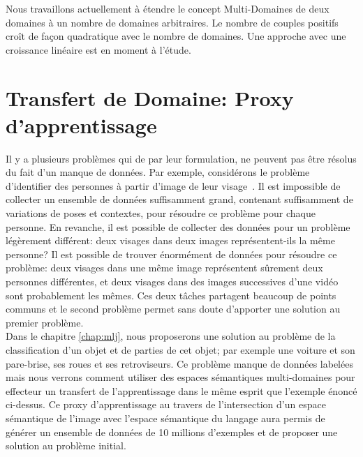 Nous travaillons actuellement à étendre le concept Multi-Domaines de deux
domaines à un nombre de domaines arbitraires. Le nombre de couples positifs
croît de façon quadratique avec le nombre de domaines. Une approche avec
une croissance linéaire est en moment à l'étude.

\section{Transfert de Domaine: Proxy d'apprentissage}

Il y a plusieurs problèmes qui de par leur formulation, ne peuvent pas être
résolus du fait d'un manque de données. Par exemple, considérons le problème
d'identifier des personnes à partir d'image de leur visage~\citep{bottou-11}.
Il est impossible de collecter un ensemble de données suffisamment grand,
contenant suffisamment de variations de poses et contextes, pour résoudre ce
problème pour chaque personne. En revanche, il est possible de collecter des
données pour un problème légèrement différent: deux visages dans deux images
représentent-ils la même personne? Il est possible de trouver énormément de
données pour résoudre ce problème: deux visages dans une même image
représentent sûrement deux personnes différentes, et deux visages dans des
images successives d'une vidéo sont probablement les mêmes. Ces deux tâches
partagent beaucoup de points communs et le second problème permet sans doute
d'apporter une solution au premier problème. 
\\

Dans le chapitre \ref{chap:mlj}, nous proposerons une solution au problème de
la classification d'un objet et de parties de cet objet; par exemple une
voiture et son pare-brise, ses roues et ses retroviseurs. Ce problème manque de
données labelées mais nous verrons comment utiliser des espaces sémantiques
multi-domaines pour effecteur un transfert de l'apprentissage dans le même
esprit que l'exemple énoncé ci-dessus. Ce proxy d'apprentissage au travers de
l'intersection d'un espace sémantique de l'image avec l'espace sémantique du
langage aura permis de générer un ensemble de données de 10 millions d'exemples
et de proposer une solution au problème initial.


